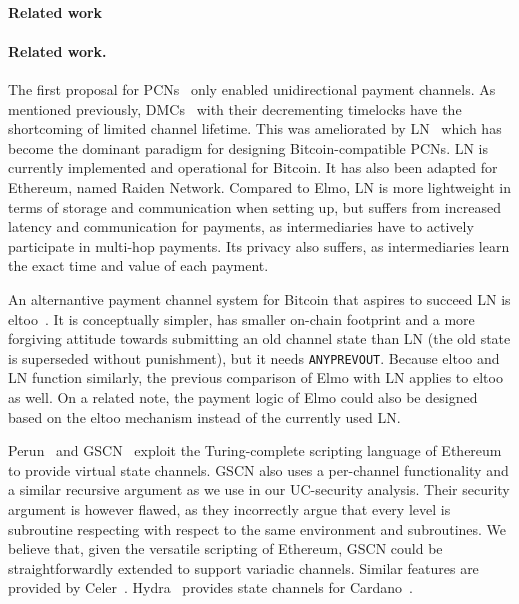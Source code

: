\makeatletter%
%
  {\paragraph{Related work}}%
  {\paragraph{Related work.}}%
\makeatother%
 The first proposal for PCNs~\cite{spilman} only enabled
 unidirectional payment channels. As mentioned previously, DMCs~\cite{decker}
 with their decrementing timelocks have the shortcoming of limited channel
 lifetime. This was ameliorated by LN~\cite{lightning} which has become the dominant paradigm for designing Bitcoin-compatible PCNs.
 LN is currently implemented and operational for
  Bitcoin. It has also been adapted for Ethereum, named
  Raiden Network. Compared to Elmo, LN is more lightweight in terms of
  storage and communication when setting up, but suffers from increased latency
  and communication for payments, as intermediaries have to actively participate
  in multi-hop payments. Its privacy also suffers, as intermediaries
  learn the exact time and value of each payment.

  An alternantive payment channel system for Bitcoin that aspires to
  succeed LN is eltoo~\cite{eltoo}. It is conceptually simpler,
  has smaller on-chain footprint and a more forgiving attitude towards
  submitting an old channel state than LN (the old state is superseded without punishment), but it needs
  \texttt{ANYPREVOUT}. Because eltoo and LN function similarly, the previous comparison of
  Elmo with LN applies to eltoo as well. On a related note, the payment
  logic of Elmo could also be designed based on the eltoo mechanism instead of
  the currently used LN.

Perun~\cite{perun} and GSCN~\cite{DBLP:conf/ccs/DziembowskiFH18} exploit the
  Turing-complete scripting language of Ethereum to provide virtual state
  channels.
  GSCN also uses a per-channel functionality and a similar recursive argument
  as we use in our UC-security analysis. Their security argument is however
  flawed, as they incorrectly argue that every level is subroutine respecting
  with respect to the same environment and subroutines.
  We believe that, given the versatile scripting of Ethereum, GSCN could be
  straightforwardly extended to support variadic channels. 
  Similar features are provided by Celer~\cite{dong2018celer}.
  Hydra~\cite{cryptoeprint:2020:299} provides state channels for
  Cardano~\cite{cardano}.

